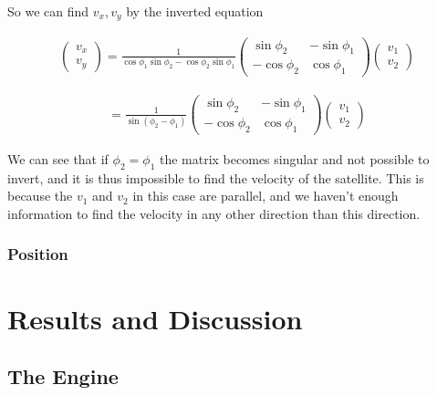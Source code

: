\documentclass[a4paper, 10pt]{article}
\begin{document}
So we can find $v_x,v_y$ by the inverted equation

\begin{align}
\begin{pmatrix}
v_x\\
v_y
\end{pmatrix}
=
\frac{1}{\cos \phi_1 \sin \phi_2 - \cos \phi_2 \sin \phi_1}
\begin{pmatrix}
\sin \phi_2 & -\sin \phi_1 \\
-\cos \phi_2 & \cos \phi_1 
\end{pmatrix}
\begin{pmatrix}
v_1\\
v_2
\end{pmatrix}
\end{align}

\begin{align}
=
\frac{1}{\sin (\phi_2 - \phi_1)}
\begin{pmatrix}
\sin \phi_2 & -\sin \phi_1 \\
-\cos \phi_2 & \cos \phi_1 
\end{pmatrix}
\begin{pmatrix}
v_1\\
v_2
\end{pmatrix}
\end{align}

We can see that if $\phi_2 = \phi_1$ the matrix becomes singular and not possible to invert, and it is thus impossible to find the velocity of the satellite. This is because the $v_1$ and $v_2$ in this case are parallel, and we haven't enough information to find the velocity in any other direction than this direction.


\subsubsection{Position}














\section{Results and Discussion}

\subsection{The Engine}
\end{document}
